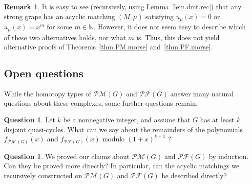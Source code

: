 \documentclass[12pt]{amsart}
\theoremstyle{definition}
\newtheorem{remark}[theorem]{Remark}
\newtheorem{question}[theorem]{Question}
\newcommand{\NN}{\mathbb{N}}
\newcommand{\tup}[1]{\left( #1 \right)}
\newcommand{\Pm}[1]{\mathcal{PM}\left(#1\right)}
\newcommand{\Pf}[1]{\mathcal{PF}\left(#1\right)}
\begin{document}
\begin{remark}
It is easy to see (recursively, using Lemma~\ref{lem.dmt.rec})
that any strong grape %
has an acyclic matching $\tup{M, \mu}$ satisfying
$u_\mu\tup{x} = 0$ or $u_\mu\tup{x} = x^m$ for some
$m \in \NN$.
However, it does not seem easy to describe which of
these two alternatives holds, nor what $m$ is.
Thus, this does not yield alternative proofs of
Theorems~\ref{thm.PM.morse} and~\ref{thm.PF.morse}.
\end{remark}

\subsection{Open questions}

While the homotopy types of $\Pm{G}$ and $\Pf{G}$ answer
many natural questions about these complexes, some further
questions remain.

\begin{question}
Let $k$ be a nonnegative integer, and assume that $G$ has at least $k$ disjoint quasi-cycles.
What can we say about the remainders of the polynomials $f_{\Pm{G}}\tup{x}$ and $f_{\Pf{G}}\tup{x}$ modulo $\tup{1+x}^{k+1}$ ?
\end{question}

\begin{question}
We proved our claims about $\Pm{G}$ and $\Pf{G}$ by induction.
Can they be proved more directly? In particular, can the
acyclic matchings we recursively constructed on $\Pm{G}$ and
$\Pf{G}$ be described directly?
\end{question}
\end{document}
